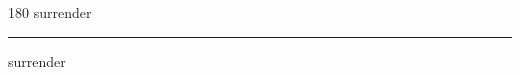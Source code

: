 
\begin{frame}
\begin{center}
\begin{turn}{180}
{\fontsize{2.5cm}{1em}\selectfont surrender}
\end{turn}
\vspace{1em}\par  
\hrule
\vspace{1em}\par  
{\fontsize{2.5cm}{1em}\selectfont surrender}
\end{center}
\end{frame}

